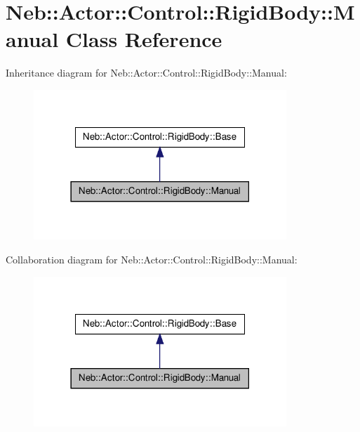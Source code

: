 \hypertarget{classNeb_1_1Actor_1_1Control_1_1RigidBody_1_1Manual}{\section{\-Neb\-:\-:\-Actor\-:\-:\-Control\-:\-:\-Rigid\-Body\-:\-:\-Manual \-Class \-Reference}
\label{classNeb_1_1Actor_1_1Control_1_1RigidBody_1_1Manual}
}


\-Inheritance diagram for \-Neb\-:\-:\-Actor\-:\-:\-Control\-:\-:\-Rigid\-Body\-:\-:\-Manual\-:\nopagebreak
\begin{figure}[H]
\begin{center}
\leavevmode
\includegraphics[width=270pt]{classNeb_1_1Actor_1_1Control_1_1RigidBody_1_1Manual__inherit__graph}
\end{center}
\end{figure}


\-Collaboration diagram for \-Neb\-:\-:\-Actor\-:\-:\-Control\-:\-:\-Rigid\-Body\-:\-:\-Manual\-:\nopagebreak
\begin{figure}[H]
\begin{center}
\leavevmode
\includegraphics[width=270pt]{classNeb_1_1Actor_1_1Control_1_1RigidBody_1_1Manual__coll__graph}
\end{center}
\end{figure}
